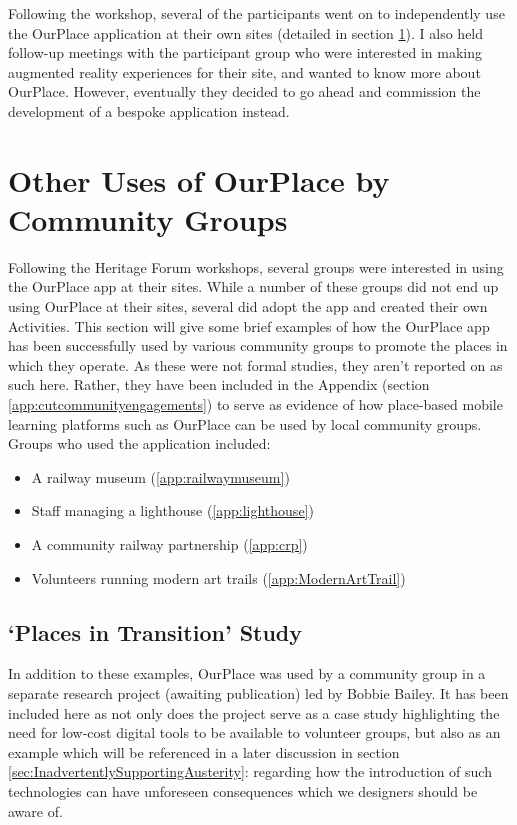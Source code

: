 Following the workshop, several of the participants went on to independently use the OurPlace application at their own sites (detailed in section \ref{sec:CommunityGroups}). I also held follow-up meetings with the participant group who were interested in making augmented reality experiences for their site, and wanted to know more about OurPlace. However, eventually they decided to go ahead and commission the development of a bespoke application instead.

\section{Other Uses of OurPlace by Community Groups}
\label{sec:CommunityGroups}

Following the Heritage Forum workshops, several groups were interested in using the OurPlace app at their sites. While a number of these groups did not end up using OurPlace at their sites, several did adopt the app and created their own Activities. This section will give some brief examples of how the OurPlace app has been successfully used by various community groups to promote the places in which they operate. As these were not formal studies, they aren't reported on as such here. Rather, they have been included in the Appendix (section \ref{app:cutcommunityengagements}) to serve as evidence of how place-based mobile learning platforms such as OurPlace can be used by local community groups. Groups who used the application included:

\begin{itemize}
  \item A railway museum (\ref{app:railwaymuseum})
  \item Staff managing a lighthouse (\ref{app:lighthouse})
  \item A community railway partnership (\ref{app:crp})
  \item Volunteers running modern art trails (\ref{app:ModernArtTrail})
\end{itemize}

\subsection{`Places in Transition' Study}
\label{sec:PlacesInTransition}

In addition to these examples, OurPlace was used by a community group in a separate research project (awaiting publication) led by Bobbie Bailey. It has been included here as not only does the project serve as a case study highlighting the need for low-cost digital tools to be available to volunteer groups, but also as an example which will be referenced in a later discussion in section \ref{sec:InadvertentlySupportingAusterity}: regarding how the introduction of such technologies can have unforeseen consequences which we designers should be aware of.


